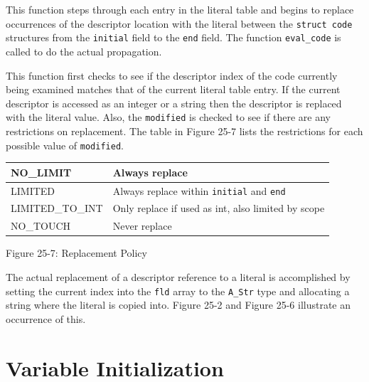 This function steps through each entry in the literal table and begins
to replace occurrences of the descriptor location with the literal
between the \texttt{struct code} structures from the \texttt{initial}
field to the \texttt{end} field.  The function \texttt{eval\_code} is
called to do the actual propagation.


This function first checks to see if the descriptor index of the code
currently being examined matches that of the current literal table
entry. If the current descriptor is accessed as an integer or a string
then the descriptor is replaced with the literal value. Also, the
\texttt{modified} is checked to see if there are any restrictions on
replacement. The table in Figure 25-7 lists the restrictions for
each possible value of \texttt{modified}.

\begin{center}
\tabletail{}
\tablelasttail{}
\begin{xtabular}{|m{1.4670599in}|m{3.2670598in}|}
\hline
{\ttfamily NO\_LIMIT} &
 Always replace\\\hline
{\ttfamily LIMITED} &
 Always replace within \texttt{initial} and \texttt{end}\\\hline
{\ttfamily LIMITED\_TO\_INT} &
 Only replace if used as int, also limited by scope\\\hline
{\ttfamily NO\_TOUCH} &
 Never replace\\\hline
\end{xtabular}
\end{center}
{\centering{}
Figure 25-7: Replacement Policy
\par}


The actual replacement of a descriptor reference to a literal is
accomplished by setting the current index into the \texttt{fld} array
to the \texttt{A\_Str} type and allocating a string where the literal
is copied into. Figure 25-2 and Figure 25-6 illustrate an occurrence
of this.

\section{Variable Initialization}


